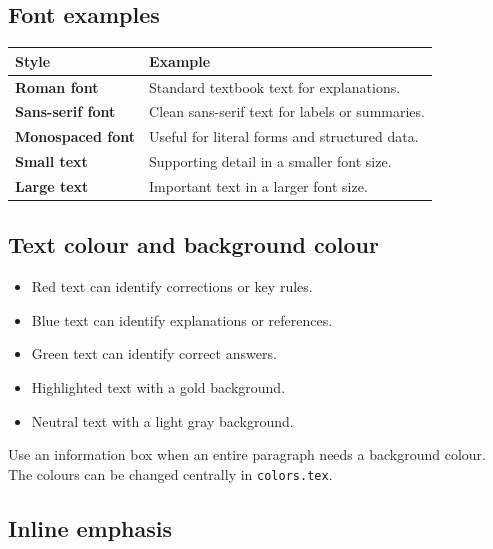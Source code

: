 \documentclass[11pt,openany]{book}
\begin{document}
%
%
%
\subsection*{Font examples}

\begin{tabularx}{\textwidth}{>{\bfseries}p{3.5cm}X}
\toprule
Style & Example \\
\midrule
Roman font & {\rmfamily Standard textbook text for explanations.} \\
Sans-serif font & {\sffamily Clean sans-serif text for labels or summaries.} \\
Monospaced font & {\ttfamily Useful for literal forms and structured data.} \\
Small text & {\small Supporting detail in a smaller font size.} \\
Large text & {\large Important text in a larger font size.} \\
\bottomrule
\end{tabularx}

\subsection*{Text colour and background colour}

\begin{itemize}
  \item \textcolor{GermanRed}{Red text can identify corrections or key rules.}
  \item \textcolor{InfoBlue}{Blue text can identify explanations or references.}
  \item \textcolor{SuccessGreen}{Green text can identify correct answers.}
  \item \colorbox{SoftGold}{\strut Highlighted text with a gold background.}
  \item \colorbox{SoftGray}{\strut Neutral text with a light gray background.}
\end{itemize}

\begin{InfoBox}
Use an information box when an entire paragraph needs a background colour.
The colours can be changed centrally in \texttt{colors.tex}.
\end{InfoBox}

\subsection*{Inline emphasis}
\end{document}
